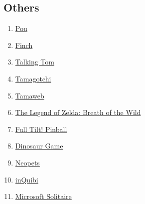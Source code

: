 \documentclass[11pt]{article}
\begin{document}
\subsection{Others}
\begin{enumerate}
    \item \label{source:others/pou} \href{https://www.pou.me/}{Pou}
    \item \label{source:others/finch} \href{https://finchcare.com/}{Finch}
    \item \label{source:others/talking_tom} \href{https://talkingtomandfriends.com/}{Talking Tom}

    \item \label{source:others/tamagotchi} \href{https://en.wikipedia.org/wiki/Tamagotchi}{Tamagotchi}
    \item \label{source:others/tamaweb} \href{https://autosam.github.io/Tamaweb/}{Tamaweb}
    \item \label{source:others/zelda} \href{https://en.wikipedia.org/wiki/The_Legend_of_Zelda:_Breath_of_the_Wild}{The Legend of Zelda: Breath of the Wild}
    
    \item \label{source:others/pinball} \href{https://en.wikipedia.org/wiki/Full_Tilt!_Pinball}{Full Tilt! Pinball}
    \item \label{source:others/dinogame} \href{https://en.wikipedia.org/wiki/Dinosaur_Game}{Dinosaur Game}

    
    \item \label{source:others/neopets} \href{https://portal.neopets.com/about-neopets}{Neopets}
    \item \label{source:others/inqubi} \href{https://inqubi.com/about/}{inQuibi}
    \item \label{source:others/solitaire} \href{https://en.wikipedia.org/wiki/Microsoft_Solitaire}{Microsoft Solitaire}
    
\end{enumerate}
\end{document}
